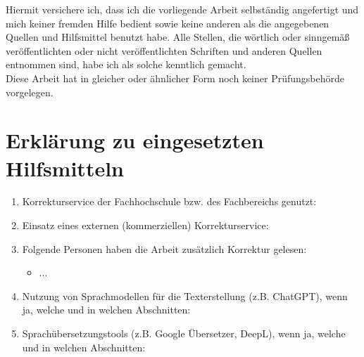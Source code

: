 Hiermit versichere ich, dass ich die vorliegende Arbeit selbständig angefertigt und mich keiner fremden Hilfe bedient sowie keine anderen als die angegebenen Quellen und Hilfsmittel benutzt habe. Alle Stellen, die wörtlich oder sinngemäß veröffentlichten oder nicht veröffentlichten Schriften und anderen Quellen entnommen sind, habe ich als solche kenntlich gemacht.\\

Diese Arbeit hat in gleicher oder ähnlicher Form noch keiner Prüfungsbehörde vorgelegen.\\
\section{Erklärung zu eingesetzten Hilfsmitteln}
\begin{enumerate}
	\item Korrekturservice der Fachhochschule bzw. des Fachbereichs genutzt:
	\item Einsatz eines externen (kommerziellen) Korrekturservice:
	\item Folgende Personen haben die Arbeit zusätzlich Korrektur gelesen:
	\begin{itemize}
		\item ...
	\end{itemize}
	\item Nutzung von Sprachmodellen für die Texterstellung (z.B. ChatGPT), wenn ja, welche und in welchen Abschnitten:
	\item Sprachübersetzungstools (z.B. Google Übersetzer, DeepL), wenn ja, welche und in welchen Abschnitten:

\end{enumerate}
